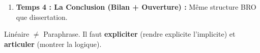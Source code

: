 \documentclass[11pt]{article}
\newcommand{\cle}[1]{{\popxbold\color{popdark}#1}}
\begin{document}
\begin{methode}
\begin{enumerate}
\begin{itemize}
        \item \textbf{Limites / Objections :} Qu'est-ce que le texte ne dit pas ? Quelles difficultés ? (Ex: Comment garantir la communion sans État de droit kantien ? Risque de subjectivisme ? Difficulté de définir le « noyau »).
        \item \textbf{Dépassement / Complément :} Autre auteur (Kant si texte Mounier, ou Ricœur, Levinas, Arendt) qui complète ou corrige.
    \end{itemize}
    \item \textbf{Temps 4 : La Conclusion (Bilan + Ouverture) :} Même structure BRO que dissertation.
\end{enumerate}
\cle{Linéaire $\neq$ Paraphrase. Il faut \textbf{expliciter} (rendre explicite l'implicite) et \textbf{articuler} (montrer la logique).}
\end{methode}
\end{document}
